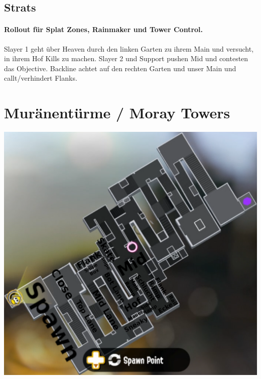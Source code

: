 \documentclass{scrreprt}
\begin{document}
\subsection{Strats}
\paragraph{Rollout für Splat Zones, Rainmaker und Tower Control.} Slayer 1 geht über Heaven durch den linken Garten zu ihrem Main und versucht, in ihrem Hof Kills zu machen. Slayer 2 und Support pushen Mid und contesten das Objective. Backline achtet auf den rechten Garten und unser Main und callt/verhindert Flanks.
\section{Muränentürme / Moray Towers}
\includegraphics[width=\linewidth]{img/moraytowers.png}
\end{document}
